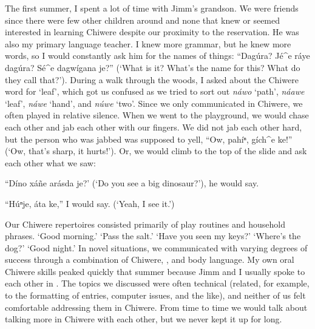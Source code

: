 \documentclass[output=paper]{LSP/langsci}
\begin{document}
The first summer, I spent a lot of time with Jimm's grandson. We were friends since there were few other children around and none that knew or seemed interested in learning Chiwere despite our proximity to the reservation. He was also my primary language teacher. I knew more grammar, but he knew more words, so I would constantly ask him for the names of things: ``Dagúra? Jé\^{ }e ráye dagúra? Sé\^{ }e dagwígana je?'' (`What is it? What's the name for this? What do they call that?'). During a walk through the woods, I asked about the Chiwere word for `leaf', which got us confused as we tried to sort out \emph{náwo} `path', \emph{náawe} `leaf', \emph{náwe} `hand', and \emph{núwe} `two'. Since we only communicated in Chiwere, we often played in relative silence. When we went to the playground, we would chase each other and jab each other with our fingers. We did not jab each other hard, but the person who was jabbed was supposed to yell, ``Ow, pahíⁿ, gích\^{ }e ke!'' (`Ow, that's sharp, it hurts!'). Or, we would climb to the top of the slide and ask each other what we saw:

	``Díno xáñe arásda je?' (`Do you see a big dinosaur?'), he would say.
	
	``Húⁿje, áta ke,'' I would say. (`Yeah, I see it.')

Our Chiwere repertoires consisted primarily of play routines and household phrases. `Good morning.' `Pass the salt.' `Have you seen my keys?' `Where's the dog?' `Good night.' In novel situations, we communicated with varying degrees of success through a combination of Chiwere, , and body language. My own oral Chiwere skills peaked quickly that summer because Jimm and I usually spoke to each other in . The topics we discussed were often technical (related, for example, to the formatting of  entries, computer issues, and the like), and neither of us felt comfortable addressing them in Chiwere. From time to time we would talk about talking more in Chiwere with each other, but we never kept it up for long.
\end{document}
